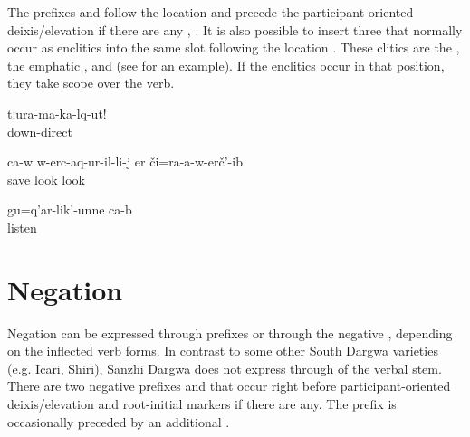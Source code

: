 The  prefixes  and  follow the location  and precede the participant-oriented deixis/elevation  if there are any , . It is also possible to insert three  that normally occur as enclitics into the same slot following the location . These clitics are the   , the emphatic   , and  (see  for an example). If the enclitics occur in that position, they take scope over the verb.
%
\begin{exe}
	\ex	\label{ex:Do not go out (of the car) (said to a man) verbs}
	\gll	tːura-ma-ka-lq-ut!\\
		down-direct\\
	\glt	{}

	\ex	\label{ex:He did not even look at his savior verbs}
	\gll	ca-w	w-erc-aq-ur-il-li-j	er či=ra-a-w-erč'-ib\\
			save	look look\\
	\glt	{}

	\ex	\label{ex:As for listening, s/he is listening verbs}
	\gll	gu=q'ar-lik'-unne	ca-b\\
		listen	\\
	\glt	{}
\end{exe}



\section{Negation}
\label{sec:Negation}

Negation can be expressed through prefixes or through the negative , depending on the inflected verb forms. In contrast to some other South Dargwa varieties (e.g. Icari, Shiri), Sanzhi Dargwa does not express  through  of the verbal stem. There are two negative prefixes  and  that occur right before participant-oriented deixis/elevation  and root-initial  markers if there are any. The prefix  is occasionally preceded by an additional  .

